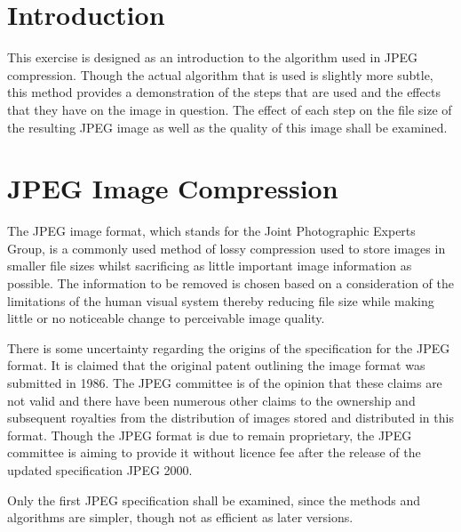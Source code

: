 
\section{Introduction} %
\label{sec:introduction}
This exercise is designed as an introduction to the algorithm used in JPEG compression. Though the actual algorithm that is used is slightly more subtle, this method provides a demonstration of the steps that are used and the effects that they have on the image in question. The effect of each step on the file size of the resulting JPEG image as well as the quality of this image shall be examined.

\section{JPEG Image Compression} %
\label{sec:jpeg_image_compression}
The JPEG image format, which stands for the Joint Photographic Experts Group, is a commonly used method of lossy compression used to store images in smaller file sizes whilst sacrificing as little important image information as possible. The information to be removed is chosen based on a consideration of the limitations of the human visual system thereby reducing file size while making little or no noticeable change to perceivable image quality.

There is some uncertainty regarding the origins of the specification for the JPEG format. It is claimed that the original patent outlining the image format was submitted in 1986. The JPEG committee is of the opinion that these claims are not valid and there have been numerous other claims to the ownership and subsequent royalties from the distribution of images stored and distributed in this format. Though the JPEG format is due to remain proprietary, the JPEG committee is aiming to provide it without licence fee after the release of the updated specification JPEG 2000.

Only the first JPEG specification shall be examined, since the methods and algorithms are simpler, though not as efficient as later versions.


